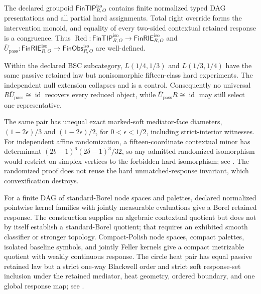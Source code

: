 \begin{description}
The declared groupoid
\(\mathsf{FinTIP}_{R,O}^{\mathrm{iso}}\) contains finite normalized typed
DAG presentations and all partial hard assignments.  Total right override
forms the intervention monoid, and equality of every two-sided contextual
retained response is a congruence.  Thus
\(\operatorname{Red}:\mathsf{FinTIP}_{R,O}^{\mathrm{iso}}
\to\mathsf{FinRIE}_{R,O}^{\mathrm{iso}}\) and
\(\overline U_{\mathrm{pass}}:\mathsf{FinRIE}_{R,O}^{\mathrm{iso}}
\to\mathsf{FinObs}_{R,O}^{\mathrm{iso}}\) are well-defined.

Within the declared BSC subcategory,
\(L(1/4,1/3)\) and \(L(1/3,1/4)\) have the same passive retained law but
nonisomorphic fifteen-class hard experiments.  The independent null extension
collapses and is a control.  Consequently no universal
\(R\overline U_{\mathrm{pass}}\cong\operatorname{id}\) recovers every
reduced object, while
\(\overline U_{\mathrm{pass}}R\cong\operatorname{id}\) may still select
one representative.

The same pair has unequal exact marked-soft mediator-face diameters,
\((1-2\epsilon)/3\) and \((1-2\epsilon)/2\), for
\(0<\epsilon<1/2\), including strict-interior witnesses.  For independent
affine randomization, a fifteen-coordinate contextual minor has determinant
\((2b-1)^6(2\delta-1)^3/32\), so any admitted randomized isomorphism would
restrict on simplex vertices to the forbidden hard isomorphism; see
.
The randomized proof does not reuse the hard unmatched-response invariant,
which convexification destroys.

For a finite DAG of standard-Borel node spaces and palettes, declared
normalized pointwise kernel families with jointly measurable evaluations give
a Borel retained response.  The construction supplies an algebraic contextual
quotient but does not by itself establish a standard-Borel quotient; that
requires an exhibited smooth classifier or stronger topology.  Compact-Polish
node spaces, compact palettes, isolated baseline symbols, and jointly Feller
kernels give a compact metrizable quotient with weakly continuous response.
The circle heat pair has equal passive retained law but a strict one-way Blackwell
order and strict soft response-set inclusion under the retained mediator,
heat geometry, ordered boundary, and one global response map; see
.


\end{description}
